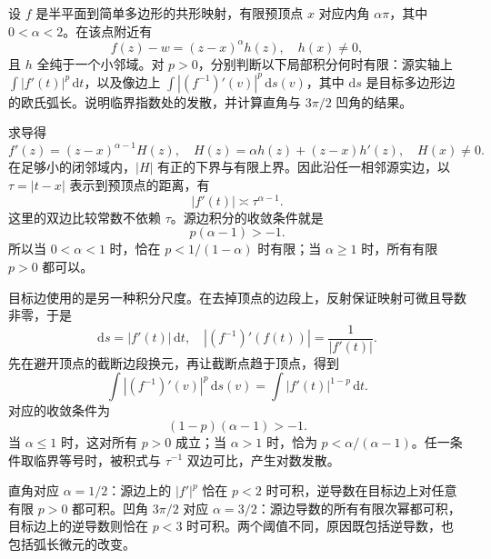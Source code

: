 \begin{exercise}\label{b3:ex:07-5}
设 \(f\) 是半平面到简单多边形的共形映射，有限预顶点 \(x\) 对应内角 \(\alpha\pi\)，其中 \(0<\alpha<2\)。在该点附近有
\[
 f(z)-w=(z-x)^\alpha h(z),\quad h(x)\ne0,
\]
且 \(h\) 全纯于一个小邻域。对 \(p>0\)，分别判断以下局部积分何时有限：源实轴上 \(\int|f'(t)|^p\,\mathrm dt\)，以及像边上 \(\int|(f^{-1})'(v)|^p\,\mathrm ds(v)\)，其中 \(\mathrm ds\) 是目标多边形边的欧氏弧长。说明临界指数处的发散，并计算直角与 \(3\pi/2\) 凹角的结果。
\end{exercise}
\begin{solution}
求导得
\[
 f'(z)=(z-x)^{\alpha-1}H(z),\quad
 H(z)=\alpha h(z)+(z-x)h'(z),\quad H(x)\ne0.
\]
在足够小的闭邻域内，\(|H|\) 有正的下界与有限上界。因此沿任一相邻源实边，以 \(\tau=|t-x|\) 表示到预顶点的距离，有
\[
 |f'(t)|\asymp\tau^{\alpha-1}.
\]
这里的双边比较常数不依赖 \(\tau\)。源边积分的收敛条件就是
\[
 p(\alpha-1)>-1.
\]
所以当 \(0<\alpha<1\) 时，恰在 \(p<1/(1-\alpha)\) 时有限；当 \(\alpha\ge1\) 时，所有有限 \(p>0\) 都可以。

目标边使用的是另一种积分尺度。在去掉顶点的边段上，反射保证映射可微且导数非零，于是
\[
 \mathrm ds=|f'(t)|\,\mathrm dt,\quad
 |(f^{-1})'(f(t))|=\frac1{|f'(t)|}.
\]
先在避开顶点的截断边段换元，再让截断点趋于顶点，得到
\[
 \int |(f^{-1})'(v)|^p\,\mathrm ds(v)
 =\int |f'(t)|^{1-p}\,\mathrm dt.
\]
对应的收敛条件为
\[
 (1-p)(\alpha-1)>-1.
\]
当 \(\alpha\le1\) 时，这对所有 \(p>0\) 成立；当 \(\alpha>1\) 时，恰为
\(p<\alpha/(\alpha-1)\)。任一条件取临界等号时，被积式与 \(\tau^{-1}\) 双边可比，产生对数发散。

直角对应 \(\alpha=1/2\)：源边上的 \(|f'|^p\) 恰在 \(p<2\) 时可积，逆导数在目标边上对任意有限 \(p>0\) 都可积。凹角 \(3\pi/2\) 对应 \(\alpha=3/2\)：源边导数的所有有限次幂都可积，目标边上的逆导数则恰在 \(p<3\) 时可积。两个阈值不同，原因既包括逆导数，也包括弧长微元的改变。
\end{solution}

